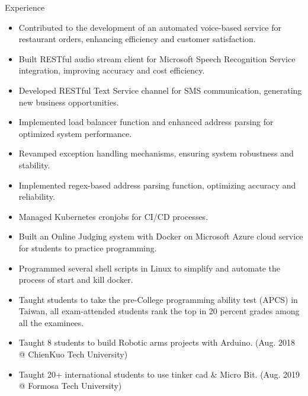\documentclass{resume} %
\begin{document}
\begin{workSection}{Experience}
    \experienceItem[
        company=Novo Labs Inc,
        location=Dallas{,} TX,
        position=Software Engineer,
        duration=Feb 2021 – Jun 2023
    ]
     \begin{itemize}
        \itemsep -6pt {} 
        \item Contributed to the development of an automated voice-based service for restaurant orders, enhancing efficiency and customer satisfaction.
        \item Built RESTful audio stream client for Microsoft Speech Recognition Service integration, improving accuracy and cost efficiency.
        \item Developed RESTful Text Service channel for SMS communication, generating new business opportunities.
        \item Implemented load balancer function and enhanced address parsing for optimized system performance.
        \item Revamped exception handling mechanisms, ensuring system robustness and stability.
        \item Implemented regex-based address parsing function, optimizing accuracy and reliability.
        \item Managed Kubernetes cronjobs for CI/CD processes.
     \end{itemize}
     
    \experienceItem[
        company=CodePro Education \& Universities,
        location=Taichung{,} Taiwan,
        position=Software Engineer \& CS Lecturer,
        duration=Dec 2019 – Dec 2020
    ]
    \begin{itemize}
        \itemsep -6pt {} 
        \item Built an Online Judging system with Docker on Microsoft Azure cloud service for students to practice programming.
        \item Programmed several shell scripts in Linux to simplify and automate the process of start and kill docker.
        \item Taught students to take the pre-College programming ability test (APCS) in Taiwan, all exam-attended students rank the top in 20 percent grades among all the examinees.
        \item Taught 8 students to build Robotic arms projects with Arduino. (Aug. 2018 @ ChienKuo Tech University)
        \item Taught 20+ international students to use tinker cad \& Micro Bit. (Aug. 2019 @ Formosa Tech University)
     \end{itemize}


\end{workSection}
\end{document}
